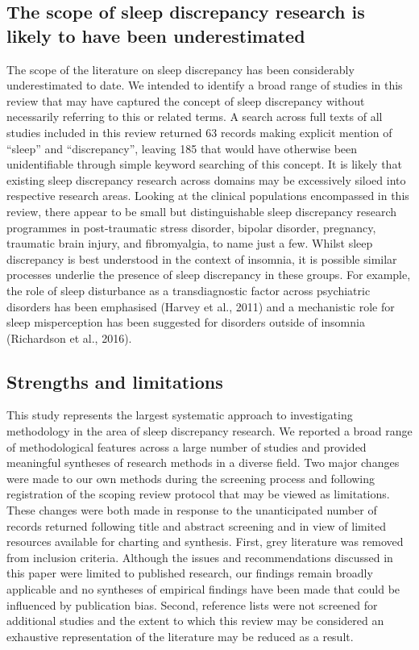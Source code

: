 \documentclass[
]{article}
\begin{document}
\subsection{The scope of sleep discrepancy research is likely to have been underestimated}\label{the-scope-of-sleep-discrepancy-research-is-likely-to-have-been-underestimated}

The scope of the literature on sleep discrepancy has been considerably underestimated to date. We intended to identify a broad range of studies in this review that may have captured the concept of sleep discrepancy without necessarily referring to this or related terms. A search across full texts of all studies included in this review returned 63 records making explicit mention of ``sleep'' and ``discrepancy'', leaving 185 that would have otherwise been unidentifiable through simple keyword searching of this concept. It is likely that existing sleep discrepancy research across domains may be excessively siloed into respective research areas. Looking at the clinical populations encompassed in this review, there appear to be small but distinguishable sleep discrepancy research programmes in post-traumatic stress disorder, bipolar disorder, pregnancy, traumatic brain injury, and fibromyalgia, to name just a few. Whilst sleep discrepancy is best understood in the context of insomnia, it is possible similar processes underlie the presence of sleep discrepancy in these groups. For example, the role of sleep disturbance as a transdiagnostic factor across psychiatric disorders has been emphasised (Harvey et al., 2011) and a mechanistic role for sleep misperception has been suggested for disorders outside of insomnia (Richardson et al., 2016).

\subsection{Strengths and limitations}\label{item20}

This study represents the largest systematic approach to investigating methodology in the area of sleep discrepancy research. We reported a broad range of methodological features across a large number of studies and provided meaningful syntheses of research methods in a diverse field. Two major changes were made to our own methods during the screening process and following registration of the scoping review protocol that may be viewed as limitations. These changes were both made in response to the unanticipated number of records returned following title and abstract screening and in view of limited resources available for charting and synthesis. First, grey literature was removed from inclusion criteria. Although the issues and recommendations discussed in this paper were limited to published research, our findings remain broadly applicable and no syntheses of empirical findings have been made that could be influenced by publication bias. Second, reference lists were not screened for additional studies and the extent to which this review may be considered an exhaustive representation of the literature may be reduced as a result.
\end{document}
